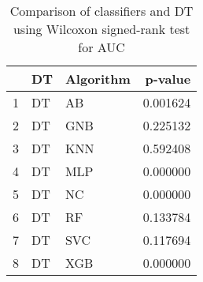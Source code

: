 \begin{table}
\footnotesize
\caption{Comparison of classifiers and DT using Wilcoxon signed-rank test for AUC}
\label{tab:DT wilcoxon AUC comparison}
\begin{tabular}{lllr}
\hline
 & DT & Algorithm & p-value \\
\hline
1 & DT & AB & 0.001624 \\
2 & DT & GNB & 0.225132 \\
3 & DT & KNN & 0.592408 \\
4 & DT & MLP & 0.000000 \\
5 & DT & NC & 0.000000 \\
6 & DT & RF & 0.133784 \\
7 & DT & SVC & 0.117694 \\
8 & DT & XGB & 0.000000 \\
\hline
\end{tabular}
\end{table}
